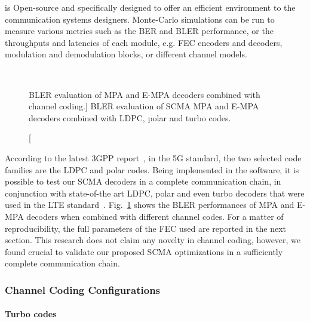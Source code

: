 \AFFECT is Open-source and specifically designed to offer an efficient
environment to the communication systems designers. Monte-Carlo simulations can
be run to measure various metrics such as the BER and BLER performance, or the
throughputs and latencies of each module, e.g. FEC encoders and decoders,
modulation and demodulation blocks, or different channel models.

\begin{figure}[htp]
  \centering
  \\
  \centering
  \caption
    [BLER evaluation of MPA and E-MPA decoders combined with channel coding.]
    {BLER evaluation of SCMA MPA and E-MPA decoders combined with LDPC, polar
    and turbo codes.}
  \label{plot:scma_fec}
\end{figure}

According to the latest 3GPP report~\cite{ETSI2018}, in the 5G standard, the
two selected code families are the LDPC and polar codes. Being implemented in
the \AFFECT software, it is possible to test our SCMA decoders in a complete
communication chain, in conjunction with state-of-the art LDPC, polar and even
turbo decoders that were used in the LTE standard~\cite{ETSI2013}.
Fig.~\ref{plot:scma_fec} shows the BLER performances of MPA and E-MPA decoders
when combined with different channel codes. For a matter of reproducibility, the
full parameters of the FEC used are reported in the next section. This research
does not claim any novelty in channel coding, however, we found crucial to
validate our proposed SCMA optimizations in a sufficiently complete
communication chain.

\subsubsection{Channel Coding Configurations}
\label{sec:scma_fec_characteristics}

\paragraph{Turbo codes}


